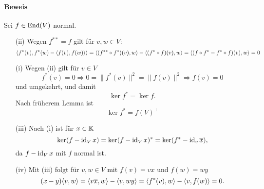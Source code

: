 \paragraph{Beweis}
	Sei $ f\in \operatorname{End}(V) $ normal.
		\begin{enumerate}
			\item[(ii)] Wegen $ f^{**} = f $ gilt für $ v,w\in V $:
				\[ \langle f^*(v),f^*(w)-\langle f(v),f(w) \rangle \rangle = \langle (f^{**}\circ f^*)(v),w \rangle-\langle (f^*\circ f)(v),w \rangle = \langle (f\circ f^*-f^*\circ f)(v),w \rangle = 0 \]
			\item[(i)] Wegen (ii) gilt für $ v\in V $
				\[ f^*(v) = 0 \Rightarrow 0 = \|f^*(v)\|^2 = \|f(v)\|^2\Rightarrow f(v) = 0 \]
				und umgekehrt, und damit
				\[ \ker f^* = \ker f. \]
				Nach früherem Lemma ist
					\[ \ker f^* = f(V)^\perp \]
			\item[(iii)] Nach (i) ist für $ x\in \mathbb{K} $
				\[ \ker(f-\operatorname{id}_Vx) = \ker(f-\operatorname{id}_Vx)^* = \ker(f^*-\operatorname{id}_v\overline{x}), \]
				da $ f-\operatorname{id}_Vx $ mit $ f $ normal ist.
			\item[(iv)] Mit (iii) folgt für $ v,w\in V $ mit $ f(v) = vx $ und $ f(w) = wy $	\[ (x-y)\langle v,w \rangle=\langle v\overline{x},w \rangle-\langle v,wy \rangle = \langle f^*(v),w \rangle-\langle v,f(w) \rangle = 0. \] 
		\end{enumerate}